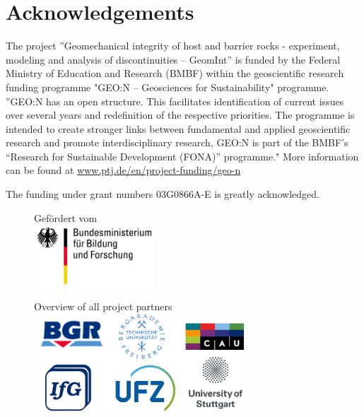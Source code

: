 %
%

\section*{Acknowledgements}
The project ''Geomechanical integrity of host and barrier rocks - experiment, modeling and analysis of discontinuities -- GeomInt'' is funded by the Federal Ministry of Education and Research (BMBF) within the geoscientific research funding programme "GEO:N – Geosciences for Sustainability" programme. 
%
''GEO:N has an open structure. This facilitates identification of current issues over several years and redefinition of the respective priorities. The programme is intended to create stronger links between fundamental and applied geoscientific research and promote interdisciplinary research, GEO:N is part of the BMBF's “Research for Sustainable Development (FONA)” programme."
%
More information can be found at \url{www.ptj.de/en/project-funding/geo-n}

\bigskip
The funding under grant numbers 03G0866A-E is greatly acknowledged.

\begin{figure}[ht!]
\centering
Gef\"ordert vom \\[2mm]
\includegraphics[width=0.4\textwidth]{figures/bmbf.png}
\label{fig:BMBF_1}
\end{figure}

\vspace{1cm}

\begin{figure}[ht!]
\centering
Overview of all project partners \\[4mm]
\includegraphics[width=0.7\textwidth]{figures/partner.png}
\label{fig:logos_all}
\end{figure}
